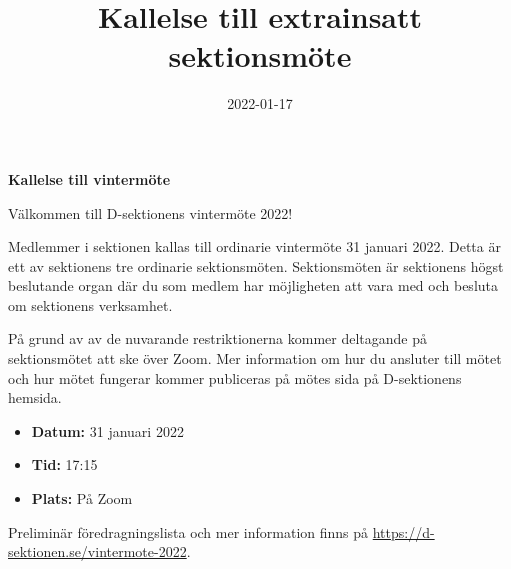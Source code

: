 \documentclass{datateknologsektionen-document}
\title{Kallelse till extrainsatt sektionsmöte}
\date{2022-01-17}
\begin{document}





\large
\begin{center}
  \vspace*{5mm}
  {\LARGE\bfseries Kallelse till vintermöte}
  \vspace{2mm}
\end{center}

Välkommen till D-sektionens vintermöte 2022!

Medlemmer i sektionen kallas till ordinarie vintermöte 31 januari 2022.
Detta är ett av sektionens tre ordinarie sektionsmöten. Sektionsmöten är sektionens högst beslutande organ där du som medlem har möjligheten att vara med och besluta om sektionens verksamhet.

På grund av av de nuvarande restriktionerna kommer deltagande på sektionsmötet att ske över Zoom. Mer information om hur du ansluter till mötet och hur mötet fungerar kommer publiceras på mötes sida på D-sektionens hemsida.

\vspace*{4mm}
\begin{itemize}
  \item \textbf{Datum:} 31 januari 2022
  \item \textbf{Tid:} 17:15
  \item \textbf{Plats:} På Zoom
\end{itemize}

Preliminär föredragningslista och mer information finns på \url{https://d-sektionen.se/vintermote-2022}.
\end{document}
